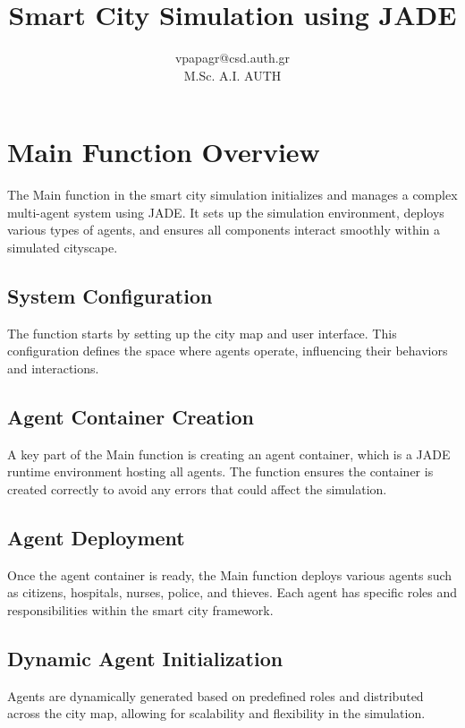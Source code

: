 \documentclass[conference]{IEEEtran}
\begin{document}
\title{Smart City Simulation using JADE }

\author{
vpapagr@csd.auth.gr\\
M.Sc. A.I. AUTH}

\maketitle


  
  \section{Main Function Overview}
  The Main function in the smart city simulation initializes and manages a complex multi-agent system using JADE. It sets up the simulation environment, deploys various types of agents, and ensures all components interact smoothly within a simulated cityscape.
  
  \subsection{System Configuration}
  The function starts by setting up the city map and user interface. This configuration defines the space where agents operate, influencing their behaviors and interactions.
  
  \subsection{Agent Container Creation}
  A key part of the Main function is creating an agent container, which is a JADE runtime environment hosting all agents. The function ensures the container is created correctly to avoid any errors that could affect the simulation.
  
  \subsection{Agent Deployment}
  Once the agent container is ready, the Main function deploys various agents such as citizens, hospitals, nurses, police, and thieves. Each agent has specific roles and responsibilities within the smart city framework.
  
  \subsection{Dynamic Agent Initialization}
  Agents are dynamically generated based on predefined roles and distributed across the city map, allowing for scalability and flexibility in the simulation.
  
\end{document}
